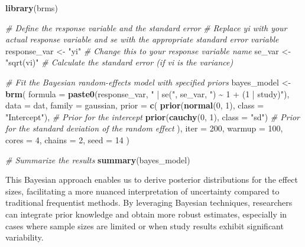 \documentclass[
]{book}
\newenvironment{Shaded}{\begin{snugshade}}{\end{snugshade}}
\newcommand{\AttributeTok}[1]{\textcolor[rgb]{0.13,0.29,0.53}{#1}}
\newcommand{\CommentTok}[1]{\textcolor[rgb]{0.56,0.35,0.01}{\textit{#1}}}
\newcommand{\DecValTok}[1]{\textcolor[rgb]{0.00,0.00,0.81}{#1}}
\newcommand{\FunctionTok}[1]{\textcolor[rgb]{0.13,0.29,0.53}{\textbf{#1}}}
\newcommand{\NormalTok}[1]{#1}
\newcommand{\OtherTok}[1]{\textcolor[rgb]{0.56,0.35,0.01}{#1}}
\newcommand{\StringTok}[1]{\textcolor[rgb]{0.31,0.60,0.02}{#1}}
\begin{document}
\begin{Shaded}
\begin{Highlighting}[]
\FunctionTok{library}\NormalTok{(brms)}

\CommentTok{\# Define the response variable and the standard error}
\CommentTok{\# Replace \textquotesingle{}yi\textquotesingle{} with your actual response variable and \textquotesingle{}se\textquotesingle{} with the appropriate standard error variable}
\NormalTok{response\_var }\OtherTok{\textless{}{-}} \StringTok{"yi"}  \CommentTok{\# Change this to your response variable name}
\NormalTok{se\_var }\OtherTok{\textless{}{-}} \StringTok{"sqrt(vi)"}  \CommentTok{\# Calculate the standard error (if vi is the variance)}

\CommentTok{\# Fit the Bayesian random{-}effects model with specified priors}
\NormalTok{bayes\_model }\OtherTok{\textless{}{-}} \FunctionTok{brm}\NormalTok{(}
  \AttributeTok{formula =} \FunctionTok{paste0}\NormalTok{(response\_var, }\StringTok{" | se("}\NormalTok{, se\_var, }\StringTok{") \textasciitilde{} 1 + (1 | study)"}\NormalTok{),}
  \AttributeTok{data =}\NormalTok{ dat,}
  \AttributeTok{family =}\NormalTok{ gaussian,}
  \AttributeTok{prior =} \FunctionTok{c}\NormalTok{(}
    \FunctionTok{prior}\NormalTok{(}\FunctionTok{normal}\NormalTok{(}\DecValTok{0}\NormalTok{, }\DecValTok{1}\NormalTok{), }\AttributeTok{class =} \StringTok{"Intercept"}\NormalTok{),   }\CommentTok{\# Prior for the intercept}
    \FunctionTok{prior}\NormalTok{(}\FunctionTok{cauchy}\NormalTok{(}\DecValTok{0}\NormalTok{, }\DecValTok{1}\NormalTok{), }\AttributeTok{class =} \StringTok{"sd"}\NormalTok{)            }\CommentTok{\# Prior for the standard deviation of the random effect}
\NormalTok{  ),}
  \AttributeTok{iter =} \DecValTok{200}\NormalTok{,}
  \AttributeTok{warmup =} \DecValTok{100}\NormalTok{,}
  \AttributeTok{cores =} \DecValTok{4}\NormalTok{,}
  \AttributeTok{chains =} \DecValTok{2}\NormalTok{,}
  \AttributeTok{seed =} \DecValTok{14}
\NormalTok{)}

\CommentTok{\# Summarize the results}
\FunctionTok{summary}\NormalTok{(bayes\_model)}
\end{Highlighting}
\end{Shaded}

This Bayesian approach enables us to derive posterior distributions for the effect sizes, facilitating a more nuanced interpretation of uncertainty compared to traditional frequentist methods. By leveraging Bayesian techniques, researchers can integrate prior knowledge and obtain more robust estimates, especially in cases where sample sizes are limited or when study results exhibit significant variability.
\end{document}

